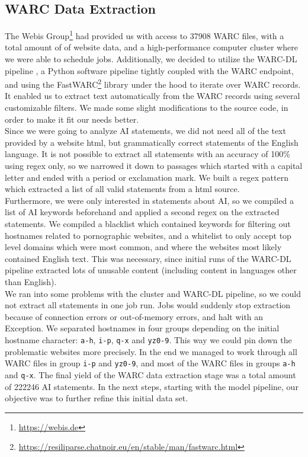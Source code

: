 \subsection{WARC Data Extraction}
The Webis Group\footnote{\url{https://webis.de}} had provided us with access to 37908 WARC files, with a total amount of  of website data, and a high-performance computer cluster where we were able to schedule jobs.
Additionally, we decided to utilize the WARC-DL pipeline \citep{Deckers2022}, a Python software pipeline tightly coupled with the WARC endpoint, and using the FastWARC\footnote{\url{https://resiliparse.chatnoir.eu/en/stable/man/fastwarc.html}} library under the hood to iterate over WARC records.
It enabled us to extract text automatically from the WARC records using several customizable filters.
We made some slight modifications to the source code, in order to make it fit our needs better.
\\
Since we were going to analyze AI statements, we did not need all of the text provided by a website html, but grammatically correct statements of the English language.
It is not possible to extract all statements with an accuracy of 100\% using regex only, so we narrowed it down to passages which started with a capital letter and ended with a period or exclamation mark.
We built a regex pattern which extracted a list of all valid statements from a html source.
\\
Furthermore, we were only interested in statements about AI, so we compiled a list of AI keywords beforehand and applied a second regex on the extracted statements.
We compiled a blacklist which contained keywords for filtering out hostnames related to pornographic websites, and a whitelist to only accept top level domains which were most common, and where the websites most likely contained English text.
This was necessary, since initial runs of the WARC-DL pipeline extracted lots of unusable content (including content in languages other than English).
\\
We ran into some problems with the cluster and WARC-DL pipeline, so we could not extract all statements in one job run.
Jobs would suddenly stop extraction because of connection errors or out-of-memory errors, and halt with an Exception.
We separated hostnames in four groups depending on the initial hostname character: \texttt{a-h}, \texttt{i-p}, \texttt{q-x} and \texttt{yz0-9}.
This way we could pin down the problematic websites more precisely.
In the end we managed to work through all WARC files in group \texttt{i-p} and \texttt{yz0-9}, and most of the WARC files in groups \texttt{a-h} and \texttt{q-x}.
The final yield of the WARC data extraction stage was a total amount of 222246 AI statements.
In the next steps, starting with the model pipeline, our objective was to further refine this initial data set.

